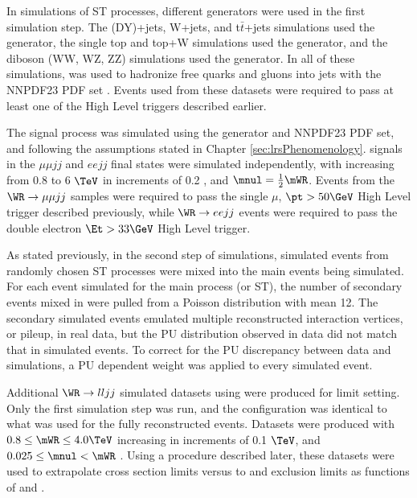 In simulations of ST processes, different \MC generators were used in the first simulation step.  
The \DY (DY)+jets, W+jets, and t$\bar{t}$+jets simulations used the \MADGRAPH \cite{madgraph} generator, 
the single top and top+W simulations used the \POWHEG \cite{powheg} generator, and the diboson (WW, WZ, ZZ) 
simulations used the \PYTHIA \cite{pythia8,Sjostrand:2006za} generator.  In all of these 
simulations, \PYTHIA was used to hadronize free quarks and gluons into jets with the NNPDF23 PDF set 
\cite{nnpdf}.  Events used from these \MC datasets were required to pass at least one of the High 
Level triggers described earlier.

The \WR signal process was simulated using the \PYTHIA generator and NNPDF23 PDF set, and following 
the assumptions stated in Chapter \ref{sec:lrsPhenomenology}.  \WR signals in the $\mu\mu jj$ and $eejj$ 
final states were simulated independently, with \mWR increasing from 0.8 to 6 $\TeV$ in increments of 
0.2 \TeV, and $\mnul = \frac{1}{2}\mWR$.  Events from the $\WR \rightarrow \mu\mu jj$ samples were 
required to pass the single $\mu$, $\pt > 50 \GeV$ High Level trigger described previously, while 
$\WR \rightarrow eejj$ events were required to pass the double electron $\Et > 33 \GeV$ High Level 
trigger.

As stated previously, in the second step of \MC simulations, simulated events from randomly chosen ST 
processes were mixed into the main events being simulated.  For each event simulated for the main 
process (\WR or ST), the number of secondary events mixed in were pulled from a Poisson distribution 
with mean 12.  The secondary simulated events emulated multiple reconstructed interaction vertices, 
or pileup, in real data, but the PU distribution observed in data did not match that in simulated 
events.  To correct for the PU discrepancy between data and simulations, a PU dependent weight was 
applied to every simulated event.

Additional $\WR \rightarrow lljj$ simulated datasets using \PYTHIA were produced for limit setting.  
Only the first simulation step was run, and the \PYTHIA configuration was 
identical to what was used for the fully reconstructed \MC events.  Datasets were produced with 
$0.8 \leq \mWR \leq 4.0 \TeV$ increasing in \mWR increments of 0.1 $\TeV$, and $0.025 \leq \mnul < \mWR$ \TeV.  
Using a procedure described later, these datasets were used to extrapolate \WR cross section limits 
versus \mWR to \WR and \nul exclusion limits as functions of \mWR and \mnul.


